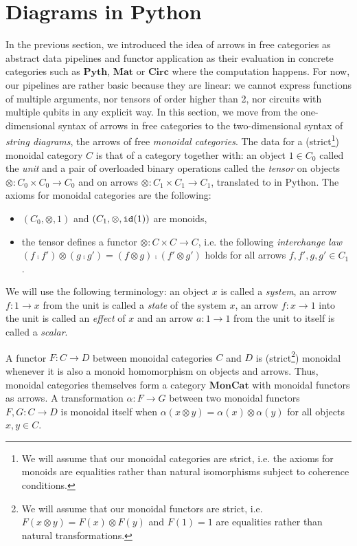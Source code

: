 
\section{Diagrams in Python} \label{section:monoidal}

In the previous section, we introduced the idea of arrows in free categories as abstract data pipelines and functor application as their evaluation in concrete categories such as $\mathbf{Pyth}$, $\mathbf{Mat}$ or $\mathbf{Circ}$ where the computation happens.
For now, our pipelines are rather basic because they are linear: we cannot express functions of multiple arguments, nor tensors of order higher than 2, nor circuits with multiple qubits in any explicit way.
In this section, we move from the one-dimensional syntax of arrows in free categories to the two-dimensional syntax of \emph{string diagrams}, the arrows of free \emph{monoidal categories}.
The data for a (strict\footnote
{We will assume that our monoidal categories are strict, i.e. the axioms for monoids are equalities rather than natural isomorphisms subject to coherence conditions.}) monoidal category $C$ is that of a category together with:
an object $1 \in C_0$ called the \emph{unit} and a pair of overloaded binary operations called the \emph{tensor} on objects $\otimes : C_0 \times C_0 \to C_0$ and on arrows $\otimes : C_1 \times C_1 \to C_1$, translated to  in Python.
The axioms for monoidal categories are the following:
\begin{itemize}
\item $(C_0, \otimes, 1)$ and $(C_1, \otimes, \mathtt{id}(1))$ are monoids,
\item the tensor defines a functor $\otimes : C \times C \to C$, i.e. the following \emph{interchange law} $(f \fcmp f') \otimes (g \fcmp g') = (f \otimes g) \fcmp (f' \otimes g')$ holds for all arrows $f, f', g, g' \in C_1$.
\end{itemize}
We will use the following terminology: an object $x$ is called a \emph{system}, an arrow $f : 1 \to x$ from the unit is called a \emph{state} of the system $x$, an arrow $f : x \to 1$ into the unit is called an \emph{effect} of $x$ and an arrow $a : 1 \to 1$ from the unit to itself is called a \emph{scalar}.

A functor $F : C \to D$ between monoidal categories $C$ and $D$ is (strict\footnote
{We will assume that our monoidal functors are strict, i.e. $F(x \otimes y) = F(x) \otimes F(y)$ and $F(1) = 1$ are equalities rather than natural transformations.}) monoidal whenever it is also a monoid homomorphism on objects and arrows.
Thus, monoidal categories themselves form a category $\mathbf{MonCat}$ with monoidal functors as arrows.
A transformation $\alpha : F \to G$ between two monoidal functors $F, G : C \to D$ is monoidal itself when $\alpha(x \otimes y) = \alpha(x) \otimes \alpha(y)$ for all objects $x, y \in C$.

